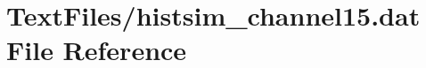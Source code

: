 \hypertarget{TextFiles_2histsim__channel15_8dat}{}\section{Text\+Files/histsim\+\_\+channel15.dat File Reference}
\label{TextFiles_2histsim__channel15_8dat}
